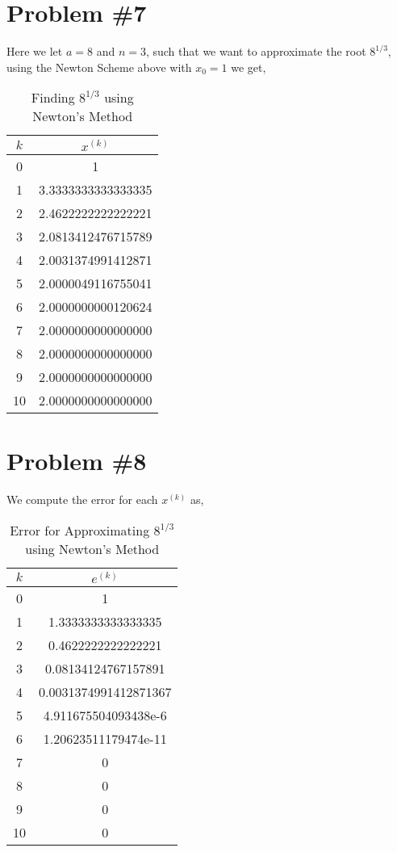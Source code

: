 \documentclass{article}
\begin{document}
\section*{Problem \#7}
Here we let $a = 8$ and $n = 3$, such that we want to approximate the root $8^{1/3}$, using the Newton Scheme above with $x_0 = 1$ we get,

\begin{table}[H]
    \centering
    \begin{tabular}{c|c}
        $k$ &  $x^{(k)}$ \\
        \hline{} 0 &  1\\
        1 & 3.3333333333333335\\
        2 & 2.4622222222222221\\
        3 & 2.0813412476715789\\
        4 & 2.0031374991412871 \\
        5 & 2.0000049116755041\\
        6 & 2.0000000000120624\\
        7 & 2.0000000000000000\\
        8 & 2.0000000000000000\\
        9 & 2.0000000000000000\\
        10 &2.0000000000000000
        
    \end{tabular}
    \caption{Finding $8^{1/3}$ using Newton's Method}
    \label{tab:my_label}
\end{table}


\section*{Problem \#8}
We compute the error for each $x^{(k)}$ as,

\begin{table}[H]
    \centering
    \begin{tabular}{c|c}
        $k$ &  $e^{(k)}$ \\
        \hline{} 0 &  1\\
        1 & 1.3333333333333335\\
        2 & 0.4622222222222221\\
        3 & 0.08134124767157891\\
        4 & 0.0031374991412871367 \\
        5 & 4.911675504093438e-6\\
        6 &  1.20623511179474e-11
\\
        7 & 0\\
        8 & 0\\
        9 & 0\\
        10 &0
        
    \end{tabular}
    \caption{Error for Approximating $8^{1/3}$ using Newton's Method}
    \label{tab:my_label}
\end{table}
\end{document}
